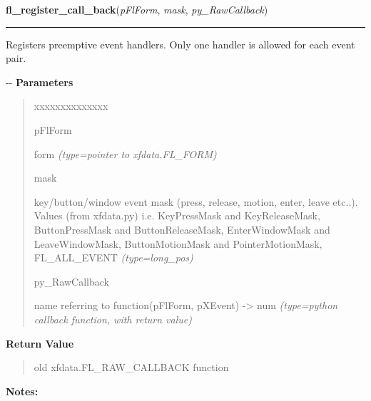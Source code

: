 \hspace{.8\funcindent}\begin{boxedminipage}{\funcwidth}

    \raggedright \textbf{fl\_register\_call\_back}(\textit{pFlForm}, \textit{mask}, \textit{py\_RawCallback})

    \vspace{-1.5ex}

    \rule{\textwidth}{0.5\fboxrule}
\setlength{\parskip}{2ex}

Registers preemptive event handlers. Only one handler is allowed
for each event pair.

-{}-
\setlength{\parskip}{1ex}
      \textbf{Parameters}
      \vspace{-1ex}

      \begin{quote}
        \begin{Ventry}{xxxxxxxxxxxxxx}

          \item[pFlForm]


form
            {\it (type=pointer to xfdata.FL\_FORM)}

          \item[mask]


key/button/window event mask (press, release, motion, enter, leave
etc..). Values (from xfdata.py) i.e. KeyPressMask and KeyReleaseMask,
ButtonPressMask and ButtonReleaseMask, EnterWindowMask and
LeaveWindowMask, ButtonMotionMask and PointerMotionMask, FL\_ALL\_EVENT
            {\it (type=long\_pos)}

          \item[py\_RawCallback]


name referring to function(pFlForm, pXEvent) -> num
            {\it (type=python callback function, with return value)}

        \end{Ventry}

      \end{quote}

      \textbf{Return Value}
    \vspace{-1ex}

      \begin{quote}

old xfdata.FL\_RAW\_CALLBACK function
      \end{quote}

\textbf{Notes:}
\begin{quote}
  \begin{itemize}


\end{itemize}
\end{quote}
\end{boxedminipage}

